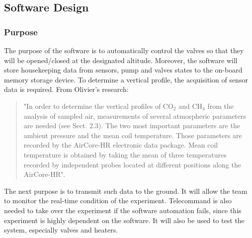 \pagebreak
\subsection{Software Design}
\subsubsection{Purpose}
The purpose of the software is to automatically control the valves so that they will be opened/closed at the designated altitude. Moreover, the software will store housekeeping data from sensors, pump and valves states to the on-board memory storage device. To determine a vertical profile, the acquisition of sensor data is required. From Olivier's research:
\begin{quote}
"In order to determine the vertical profiles of CO$_2$ and CH$_4$ from the analysis of sampled air, measurements of several atmospheric parameters are needed (see Sect. 2.3). The two most important parameters are the ambient pressure and the mean coil temperature. Those parameters are recorded by the AirCore-HR electronic data package. Mean coil temperature is obtained by taking the mean of three temperatures recorded by independent probes located at different positions along the AirCore-HR".\cite{Olivier}
\end{quote}
The next purpose is to transmit such data to the ground. It will allow the team to monitor the real-time condition of the experiment. Telecommand is also needed to take over the experiment if the software automation fails, since this experiment is highly dependent on the software. It will also be used to test the system, especially valves and heaters.\par
